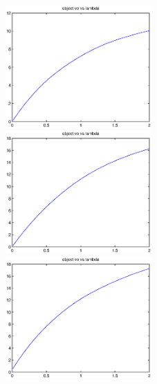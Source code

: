 \documentclass{article}
\theoremstyle{definition}
\theoremstyle{definition}
\theoremstyle{remark}
\begin{document}
\begin{figure}[!htbp]
\begin{minipage}[t]{0.3\linewidth}
\centering
\includegraphics[width=2.2in]{s3.eps}
\end{minipage}%
\begin{minipage}[t]{0.3\linewidth}
\centering
\includegraphics[width=2.2in]{m3.eps}
\end{minipage}
\begin{minipage}[t]{0.3\linewidth}
\centering
\includegraphics[width=2.2in]{l3.eps}
\end{minipage}
\end{figure}
\end{document}
